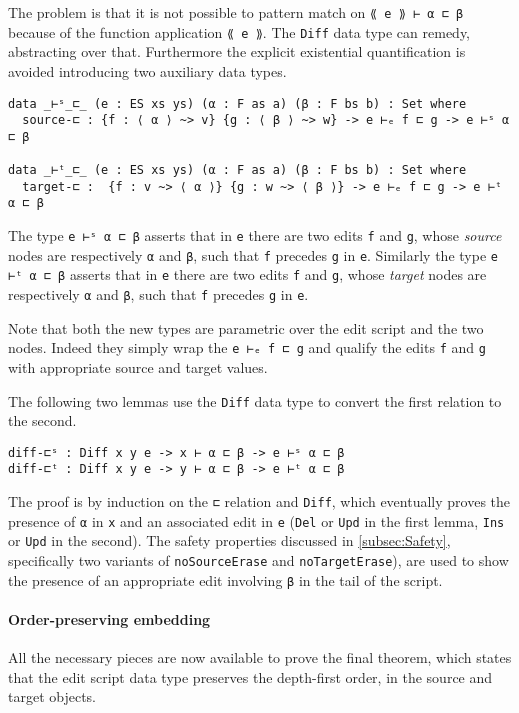 \documentclass[../Thesis.tex]{subfiles}
\begin{document}
	The problem is that it is not possible to pattern match on 
	\texttt{⟪ e ⟫ ⊢ α ⊏ β} because of the function application \texttt{⟪ e ⟫}.
	The \texttt{Diff} data type can remedy, abstracting over that.
	Furthermore the explicit existential quantification is avoided introducing
	two auxiliary data types.
	 
\begin{verbatim}
data _⊢ˢ_⊏_ (e : ES xs ys) (α : F as a) (β : F bs b) : Set where
  source-⊏ : {f : ⟨ α ⟩ ~> v} {g : ⟨ β ⟩ ~> w} -> e ⊢ₑ f ⊏ g -> e ⊢ˢ α ⊏ β 

data _⊢ᵗ_⊏_ (e : ES xs ys) (α : F as a) (β : F bs b) : Set where
  target-⊏ :  {f : v ~> ⟨ α ⟩} {g : w ~> ⟨ β ⟩} -> e ⊢ₑ f ⊏ g -> e ⊢ᵗ α ⊏ β
\end{verbatim}

	The type \texttt{e ⊢ˢ α ⊏ β} asserts that in \texttt{e} there are two
	edits \texttt{f} and \texttt{g}, whose \emph{source} nodes are respectively 
	\texttt{α} 	and \texttt{β}, such that \texttt{f} precedes \texttt{g} in \texttt{e}.
	Similarly the type \texttt{e ⊢ᵗ α ⊏ β} asserts that in \texttt{e} there are two
	edits \texttt{f} and \texttt{g}, whose \emph{target} nodes are respectively 
	\texttt{α} 	and \texttt{β}, such that \texttt{f} precedes \texttt{g} in \texttt{e}.
	
	Note that both the new types are parametric over the edit script and the 
	two nodes. Indeed they simply wrap the \texttt{e ⊢ₑ f ⊏ g} and
	qualify the edits \texttt{f} and \texttt{g} with appropriate source and
	target values.
	
	The following two lemmas use the \texttt{Diff} data type to convert
	the first relation to the second.	
\begin{verbatim}
diff-⊏ˢ : Diff x y e -> x ⊢ α ⊏ β -> e ⊢ˢ α ⊏ β
diff-⊏ᵗ : Diff x y e -> y ⊢ α ⊏ β -> e ⊢ᵗ α ⊏ β
\end{verbatim}
	The proof is by induction on the \texttt{⊏} relation and
	\texttt{Diff}, which eventually proves the presence of \texttt{α} in \texttt{x} 
	and an associated edit in \texttt{e} (\texttt{Del} or \texttt{Upd} in the first
	lemma, \texttt{Ins} or \texttt{Upd} in the second).
	The safety properties discussed in \ref{subsec:Safety}, specifically 
	two variants of \texttt{noSourceErase} and \texttt{noTargetErase}),
	are used to show the presence of an appropriate edit involving \texttt{β}
	in the tail of the script.
	
	\paragraph{Order-preserving embedding}
	All the necessary pieces are now available to prove the final theorem,
	which states that the edit script data type preserves the depth-first order,
	in the source and target objects.
\end{document}
